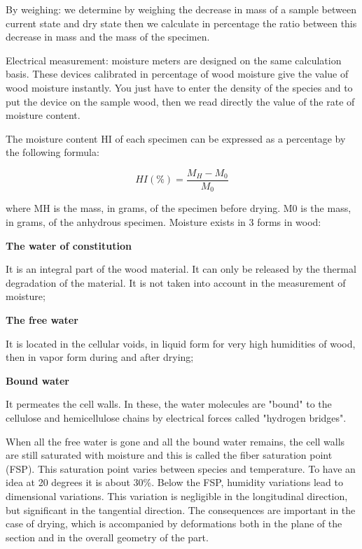 By weighing: we determine by weighing the decrease in mass of a sample between current state and dry state then we calculate in percentage the ratio between this decrease in mass and the mass of the specimen.

Electrical measurement: moisture meters are designed on the same calculation basis. These devices calibrated in percentage of wood moisture give the value of wood moisture instantly. You just have to enter the density of the species and to put the device on the sample wood, then we read directly the value of the rate of moisture content.

The moisture content HI of each specimen can be expressed as a percentage by the following formula:

\begin{equation}
	HI(\%) = \frac{M_{H}-M_{0}}{M_{0}}
\end{equation}

where MH is the mass, in grams, of the specimen before drying. M0 is the mass, in grams, of the anhydrous specimen. Moisture exists in 3 forms in wood:

\smallskip

\textbf{The water of constitution}

It is an integral part of the wood material. It can only be released by the thermal degradation of the material. It is not taken into account in the measurement of moisture;

\smallskip

\textbf{The free water}

It is located in the cellular voids, in liquid form for very high humidities of wood, then in vapor form during and after drying;

\smallskip

\textbf{Bound water}

It permeates the cell walls. In these, the water molecules are "bound" to the cellulose and hemicellulose chains by electrical forces called "hydrogen bridges".

\smallskip

When all the free water is gone and all the bound water remains, the cell walls are still saturated with moisture and this is called the fiber saturation point (FSP). This saturation point varies between species and temperature. To have an idea at 20 degrees it is about 30\%. Below the FSP, humidity variations lead to dimensional variations. This variation is negligible in the longitudinal direction, but significant in the tangential direction. The consequences are important in the case of drying, which is accompanied by deformations both in the plane of the section and in the overall geometry of the part.


